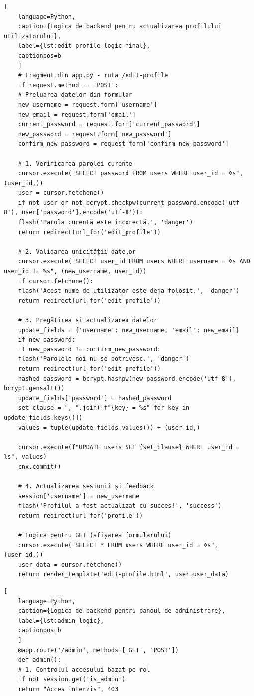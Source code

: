 \documentclass[12pt, a4paper, oneside, romanian]{teza-upb}
\begin{document}
\begin{lstlisting}[
	language=Python,
	caption={Logica de backend pentru actualizarea profilului utilizatorului},
	label={lst:edit_profile_logic_final},
	captionpos=b
	]
	# Fragment din app.py - ruta /edit-profile
	if request.method == 'POST':
	# Preluarea datelor din formular
	new_username = request.form['username']
	new_email = request.form['email']
	current_password = request.form['current_password']
	new_password = request.form['new_password']
	confirm_new_password = request.form['confirm_new_password']
	
	# 1. Verificarea parolei curente
	cursor.execute("SELECT password FROM users WHERE user_id = %s", (user_id,))
	user = cursor.fetchone()
	if not user or not bcrypt.checkpw(current_password.encode('utf-8'), user['password'].encode('utf-8')):
	flash('Parola curentă este incorectă.', 'danger')
	return redirect(url_for('edit_profile'))
	
	# 2. Validarea unicității datelor
	cursor.execute("SELECT user_id FROM users WHERE username = %s AND user_id != %s", (new_username, user_id))
	if cursor.fetchone():
	flash('Acest nume de utilizator este deja folosit.', 'danger')
	return redirect(url_for('edit_profile'))
	
	# 3. Pregătirea și actualizarea datelor
	update_fields = {'username': new_username, 'email': new_email}
	if new_password:
	if new_password != confirm_new_password:
	flash('Parolele noi nu se potrivesc.', 'danger')
	return redirect(url_for('edit_profile'))
	hashed_password = bcrypt.hashpw(new_password.encode('utf-8'), bcrypt.gensalt())
	update_fields['password'] = hashed_password
	set_clause = ", ".join([f"{key} = %s" for key in update_fields.keys()])
	values = tuple(update_fields.values()) + (user_id,)
	
	cursor.execute(f"UPDATE users SET {set_clause} WHERE user_id = %s", values)
	cnx.commit()
	
	# 4. Actualizarea sesiunii și feedback
	session['username'] = new_username
	flash('Profilul a fost actualizat cu succes!', 'success')
	return redirect(url_for('profile'))
	
	# Logica pentru GET (afișarea formularului)
	cursor.execute("SELECT * FROM users WHERE user_id = %s", (user_id,))
	user_data = cursor.fetchone()
	return render_template('edit-profile.html', user=user_data)
\end{lstlisting}

\begin{lstlisting}[
	language=Python,
	caption={Logica de backend pentru panoul de administrare},
	label={lst:admin_logic},
	captionpos=b
	]
	@app.route('/admin', methods=['GET', 'POST'])
	def admin():
	# 1. Controlul accesului bazat pe rol
	if not session.get('is_admin'): 
	return "Acces interzis", 403
\end{lstlisting}
\end{document}
